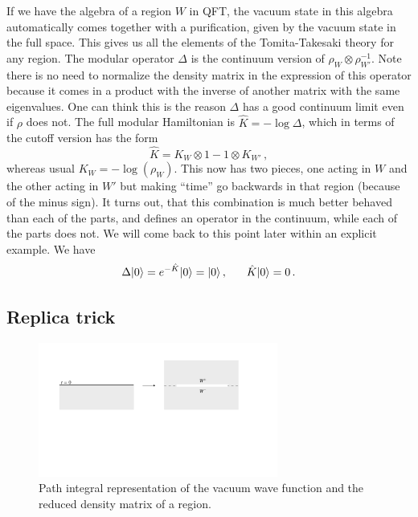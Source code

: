 \documentclass[11pt]{article}
\numberwithin{equation}{section}
\newcommand{\be}{\begin{equation}}
\newcommand{\ee}{\end{equation}}
\begin{document}
If we have the algebra of a region $W$ in QFT, the vacuum state in this algebra automatically comes together with a purification, given by the vacuum state in the full space. This gives us all the elements of the Tomita-Takesaki theory for any region. The modular operator $\Delta$ is the continuum version of $\rho_W\otimes \rho_{W'}^{-1}$. Note there is no need to normalize the density matrix in the expression of this operator because it comes in a product with the inverse of another matrix with the same eigenvalues. One can think this is the reason $\Delta$ has a good continuum limit even if $\rho$ does not. The full modular Hamiltonian is $\hat{K}=-\log \Delta$, which in terms of the cutoff version has the form
\be 
\hat{K}= K_W \otimes 1 - 1\otimes K_{W'}\,,\label{full}
\ee
whereas usual $K_{W}=-\log(\rho_W)$. This now has two pieces, one acting in $W$ and the other acting in $W'$ but making ``time'' go backwards in that region (because of the minus sign). It turns out, that this combination is much better behaved than each of the parts, and defines an operator in the continuum, while each of the parts does not.  We will come back to this point later within an explicit example. We have
\be
\Delta |0\rangle=e^{-\hat{K}} |0\rangle=|0\rangle\,,\hspace{.6cm}   \hat{K} |0\rangle=0\,. 
\ee
\subsection{Replica trick}
\begin{figure}[t]
\begin{center}  
\includegraphics[width=0.7\textwidth]{replica.pdf}
\captionsetup{width=0.9\textwidth}
\caption{Path integral representation of the vacuum wave function and the reduced density matrix of a region. }
\label{replica}
\end{center}  
\end{figure} 
\end{document}
